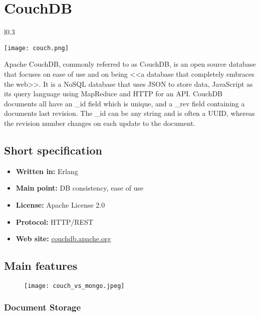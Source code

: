 \chapter{CouchDB}

\begin{wrapfigure}{l}{0.3\textwidth}
  \vspace{-110pt}
  \begin{center}
    \texttt{[image: couch.png]}
  \end{center}
  \vspace{-70pt}
\end{wrapfigure}
Apache CouchDB, commonly referred to as CouchDB, is an open source database that focuses on ease of use and on being <<a database that completely embraces the web>>. It is a NoSQL database that uses JSON to store data, JavaScript as its query language using MapReduce and HTTP for an API. CouchDB documents all have an \_id field which is unique, and a \_rev field containing a documents last revision. The \_id can be any string and is often a UUID, whereas the revision number changes on each update to the document.

\section{Short specification}

\begin{itemize}
  \item \textbf{Written in:} Erlang
  \item \textbf{Main point:} DB consistency, ease of use
  \item \textbf{License:} Apache License 2.0
  \item \textbf{Protocol:} HTTP/REST
  \item \textbf{Web site:} \href{http://couchdb.apache.org/}{couchdb.apache.org}
\end{itemize}

\section{Main features}

\begin{figure}[hb]
  \centering
  \texttt{[image: couch\_vs\_mongo.jpeg]}
\end{figure}

\subsection{Document Storage}


